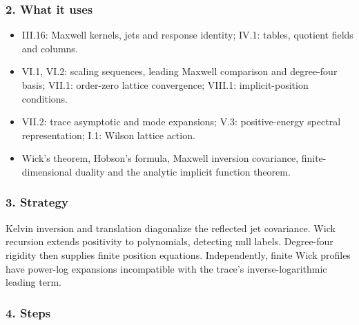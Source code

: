 \documentclass[
  letterpaper,
  11pt]{article}
\providecommand{\tightlist}{%
  \setlength{\itemsep}{0pt}\setlength{\parskip}{0pt}}
\begin{document}
\subsubsection{2. What it uses}\label{what-it-uses-27}

\begin{itemize}
\tightlist
\item
  III.16: Maxwell kernels, jets and response identity; IV.1: tables,
  quotient fields and columns.
\item
  VI.1, VI.2: scaling sequences, leading Maxwell comparison and
  degree-four basis; VII.1: order-zero lattice convergence; VIII.1:
  implicit-position conditions.
\item
  VII.2: trace asymptotic and mode expansions; V.3: positive-energy
  spectral representation; I.1: Wilson lattice action.
\item
  Wick's theorem, Hobson's formula, Maxwell inversion covariance,
  finite-dimensional duality and the analytic implicit function theorem.
\end{itemize}

\subsubsection{3. Strategy}\label{strategy-27}

Kelvin inversion and translation diagonalize the reflected jet
covariance. Wick recursion extends positivity to polynomials, detecting
null labels. Degree-four rigidity then supplies finite position
equations. Independently, finite Wick profiles have power-log expansions
incompatible with the trace's inverse-logarithmic leading term.

\subsubsection{4. Steps}\label{steps-27}
\end{document}
